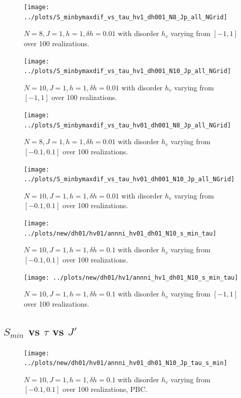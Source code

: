 \documentclass[a4paper]{article}
\begin{document}
\begin{figure}[h!]
  \centering
  \texttt{[image: ../plots/S\_minbymaxdif\_vs\_tau\_hv1\_dh001\_N8\_Jp\_all\_NGrid]}
  \caption{$N = 8, J = 1, h = 1, \delta h=0.01$ with disorder $h_v$ varying from $[-1,1]$ over 100 realizations.}
  \label{fig:}
\end{figure}

\begin{figure}[h!]
  \centering
  \texttt{[image: ../plots/S\_minbymaxdif\_vs\_tau\_hv1\_dh001\_N10\_Jp\_all\_NGrid]}
  \caption{$N = 10, J = 1, h = 1, \delta h=0.01$ with disorder $h_v$ varying from $[-1,1]$ over 100 realizations.}
  \label{fig:}
\end{figure}

\begin{figure}[h!]
  \centering
  \texttt{[image: ../plots/S\_minbymaxdif\_vs\_tau\_hv01\_dh001\_N8\_Jp\_all\_NGrid]}
  \caption{$N = 8, J = 1, h = 1, \delta h=0.01$ with disorder $h_v$ varying from $[-0.1,0.1]$ over 100 realizations.}
  \label{fig:}
\end{figure}

\begin{figure}[h!]
  \centering
  \texttt{[image: ../plots/S\_minbymaxdif\_vs\_tau\_hv01\_dh001\_N10\_Jp\_all\_NGrid]}
  \caption{$N = 10, J = 1, h = 1, \delta h=0.01$ with disorder $h_v$ varying from $[-0.1,0.1]$ over 100 realizations.}
  \label{fig:}
\end{figure}

\begin{figure}[h!]
  \centering
  \texttt{[image: ../plots/new/dh01/hv01/annni\_hv01\_dh01\_N10\_s\_min\_tau]}
  \caption{$N = 10, J = 1, h = 1, \delta h=0.1$ with disorder $h_v$ varying from $[-0.1,0.1]$ over 100 realizations.}
  \label{fig:}
\end{figure}

\begin{figure}[h!]
  \centering
  \texttt{[image: ../plots/new/dh01/hv1/annni\_hv1\_dh01\_N10\_s\_min\_tau]}
  \caption{$N = 10, J = 1, h = 1, \delta h=0.1$ with disorder $h_v$ varying from $[-1,1]$ over 100 realizations.}
  \label{fig:}
\end{figure}

\clearpage
\subsection{$S_{min}$ vs $\tau$ vs $J'$}
\begin{figure}[h!]
  \centering
  \texttt{[image: ../plots/new/dh01/hv01/annni\_hv01\_dh01\_N10\_Jp\_tau\_s\_min]}
  \caption{$N = 10, J = 1, h = 1, \delta h=0.1$ with disorder $h_v$ varying from $[-0.1,0.1]$ over 100 realizations, PBC.}
  \label{fig:}
\end{figure}
\end{document}
